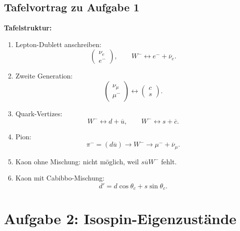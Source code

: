 \documentclass[11pt,a4paper]{scrartcl}
\theoremstyle{definition}
\theoremstyle{plain}
\theoremstyle{remark}
\begin{document}
\subsection{Tafelvortrag zu Aufgabe 1}

\begin{talkbox}
\textbf{Tafelstruktur:}
\begin{enumerate}
    \item Lepton-Dublett anschreiben:
    \[
        \begin{pmatrix}\nu_e\\ e^-\end{pmatrix},
        \qquad
        W^- \leftrightarrow e^-+\overline\nu_e.
    \]
    \item Zweite Generation:
    \[
        \begin{pmatrix}\nu_\mu\\ \mu^-\end{pmatrix}
        \leftrightarrow
        \begin{pmatrix}c\\ s\end{pmatrix}.
    \]
    \item Quark-Vertizes:
    \[
        W^-\leftrightarrow d+\overline u,
        \qquad
        W^-\leftrightarrow s+\overline c.
    \]
    \item Pion:
    \[
        \pi^-=(d\overline u)\to W^-\to\mu^-+\overline\nu_\mu.
    \]
    \item Kaon ohne Mischung: nicht möglich, weil $s\overline u W^-$ fehlt.
    \item Kaon mit Cabibbo-Mischung:
    \[
        d'=d\cos\theta_c+s\sin\theta_c.
    \]
\end{enumerate}
\end{talkbox}

\FloatBarrier
\newpage

\section{Aufgabe 2: Isospin-Eigenzust\"ande}
\end{document}
